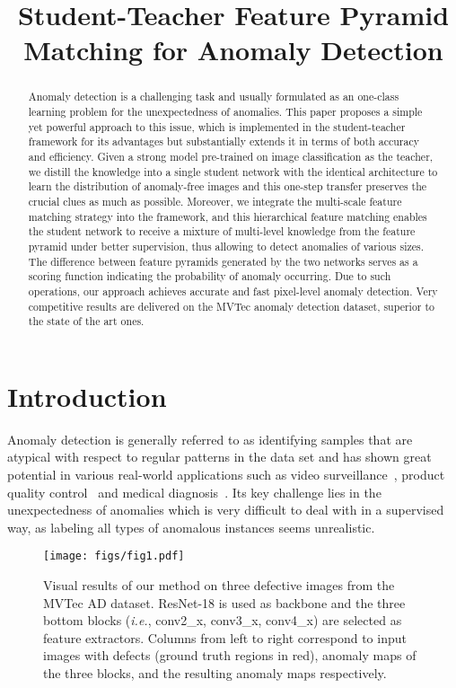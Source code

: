 \documentclass{bmvc2k}
\title{Student-Teacher Feature Pyramid Matching for Anomaly Detection}
\begin{document}
\maketitle

\begin{abstract}
   Anomaly detection is a challenging task and usually formulated as an one-class learning problem for the unexpectedness of anomalies. This paper proposes a simple yet powerful approach to this issue, which is implemented in the student-teacher framework for its advantages but substantially extends it in terms of both accuracy and efficiency. Given a strong model pre-trained on image classification as the teacher, we distill the knowledge into a single student network with the identical architecture to learn the distribution of anomaly-free images and this one-step transfer preserves the crucial clues as much as possible. Moreover, we integrate the multi-scale feature matching strategy into the framework, and this hierarchical feature matching enables the student network to receive a mixture of multi-level knowledge from the feature pyramid under better supervision, thus allowing to detect anomalies of various sizes. The difference between feature pyramids generated by the two networks serves as a scoring function indicating the probability of anomaly occurring. Due to such operations, our approach achieves accurate and fast pixel-level anomaly detection. Very competitive results are delivered on the MVTec anomaly detection dataset, superior to the state of the art ones.
\end{abstract}

\section{Introduction}
\label{sec:intro}



Anomaly detection is generally referred to as identifying samples that are atypical with respect to regular patterns in the data set and has shown great potential in various real-world applications such as video surveillance~\cite{Abati2019,Roitberg2018}, product quality control~\cite{Bergmann2019,Bergmann2020,Napoletano2018} and medical diagnosis~\cite{Schlegl2019,Schlegl2017,Vasilev2018}. Its key challenge lies in the unexpectedness of anomalies which is very difficult to deal with in a supervised way, as labeling all types of anomalous instances seems unrealistic. 

\begin{figure}
	\centering
	\texttt{[image: figs/fig1.pdf]}
	\caption{Visual results of our method on three defective images from the MVTec AD dataset. ResNet-18 is used as backbone and the three bottom blocks (\textit{i.e.}, conv2\_x, conv3\_x, conv4\_x) are selected as feature extractors. Columns from left to right correspond to input images with defects (ground truth regions in red), anomaly maps of the three blocks, and the resulting anomaly maps respectively.}
	\label{fig1}
\end{figure}
\end{document}
